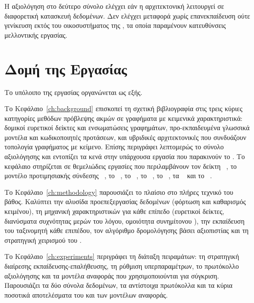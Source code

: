 \begin{enumerate}
\end{enumerate}

Η αξιολόγηση στο δεύτερο σύνολο ελέγχει εάν η αρχιτεκτονική λειτουργεί σε
διαφορετική κατασκευή δεδομένων.
Δεν ελέγχει μεταφορά χωρίς επανεκπαίδευση ούτε
γενίκευση εκτός του οικοσυστήματος της , τα οποία παραμένουν
κατευθύνσεις μελλοντικής εργασίας.


\section{Δομή της Εργασίας}
\label{sec:structure}

Το υπόλοιπο της εργασίας οργανώνεται ως εξής.

Το Κεφάλαιο~\ref{ch:background} επισκοπεί τη σχετική βιβλιογραφία στις τρεις κύριες
κατηγορίες μεθόδων πρόβλεψης ακμών σε γραφήματα με κειμενικά χαρακτηριστικά: δομικοί
ευρετικοί δείκτες και ενσωματώσεις γραφημάτων, προ-εκπαιδευμένα γλωσσικά μοντέλα και
κωδικοποιητές προτάσεων, και υβριδικές αρχιτεκτονικές που συνδυάζουν τοπολογία γραφήματος
με κείμενο.
Επίσης περιγράφει λεπτομερώς το σύνολο αξιολόγησης  και εντοπίζει τα κενά στην υπάρχουσα εργασία που παρακινούν το .
Το κεφάλαιο στηρίζεται σε θεμελιώδεις εργασίες που περιλαμβάνουν τον δείκτη
~\cite{adamic2003friends}, το μοντέλο προτιμησιακής σύνδεσης
~\cite{barabasi1999emergence}, το ~\cite{devlin2019bert}, το ~\cite{liu2019roberta},
το ~\cite{reimers2019sentence}, το ~\cite{yasunaga2022linkbert},
τα ~\cite{yang2021graphformers} και το ~\cite{jin2023patton}.

Το Κεφάλαιο~\ref{ch:methodology} παρουσιάζει το πλαίσιο  στο πλήρες
τεχνικό του βάθος.
Καλύπτει την αλυσίδα προεπεξεργασίας δεδομένων (φόρτωση και καθαρισμός
κειμένου), τη μηχανική χαρακτηριστικών για
κάθε επίπεδο (ευρετικοί δείκτες, διανύσματα συχνότητας μερών του λόγου,
ομοιότητα συνημίτονου ), την εκπαίδευση του ταξινομητή κάθε
επιπέδου, τον αλγόριθμο δρομολόγησης βάσει αξιοπιστίας και τη στρατηγική χειρισμού
του .

Το Κεφάλαιο~\ref{ch:experiments} περιγράφει τη διάταξη πειραμάτων: τη στρατηγική διαίρεσης
εκπαίδευσης-επαλήθευσης, τη ρύθμιση υπερπαραμέτρων, το πρωτόκολλο αξιολόγησης και
τα μοντέλα αναφοράς που χρησιμοποιούνται για σύγκριση.
Παρουσιάζει τα δύο σύνολα δεδομένων, τα αντίστοιχα πρωτόκολλα και τα κύρια
ποσοτικά αποτελέσματα του  και των μοντέλων αναφοράς.

